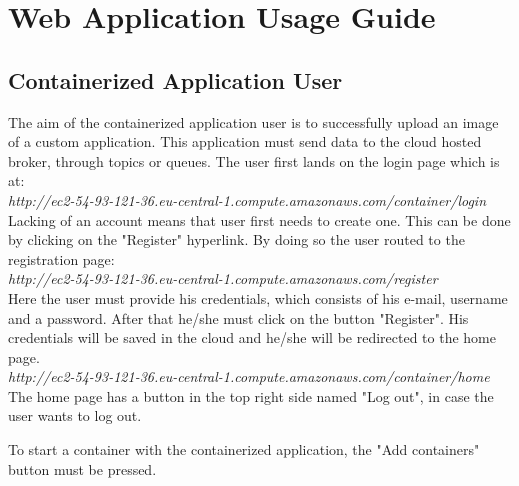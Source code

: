 \chapter{Web Application Usage Guide}
\label{chap:05}

\section{Containerized Application User}
\label{chap:05:01}

The aim of the containerized application user is to successfully upload an image of a custom application. This application must send data to the cloud hosted broker, through topics or queues. The user first lands on the login page which is at:\\

\textit{http://ec2-54-93-121-36.eu-central-1.compute.amazonaws.com/container/login}\\

Lacking of an account means that user first needs to create one. This can be done by clicking on the "Register" hyperlink. By doing so the user routed to the registration page:\\

\textit{http://ec2-54-93-121-36.eu-central-1.compute.amazonaws.com/register}\\

Here the user must provide his credentials, which consists of his e-mail, username and a password. After that he/she must click on the button "Register". His credentials will be saved in the cloud and he/she will be redirected to the home page.\\

\textit{http://ec2-54-93-121-36.eu-central-1.compute.amazonaws.com/container/home}\\

The home page has a button in the top right side named "Log out", in case the user wants to log out.

To start a container with the containerized application, the "Add containers" button must be pressed.\\

